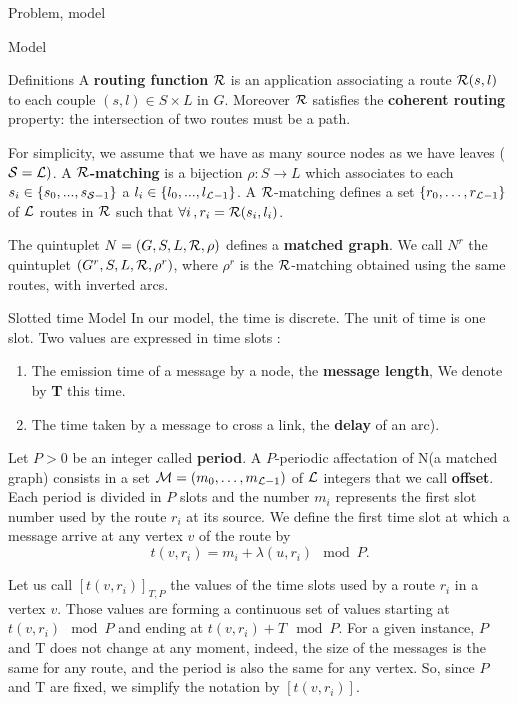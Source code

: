 \documentclass[a4paper,10pt]{report}
\newcommand\rmatching{${\cal R}$-matching\xspace}
\newcommand\matchedgraph{{\bf matched graph}}
\begin{document}
\begin{chapter}{Problem, model}
\begin{section}{Model}
\begin{subsection}{Definitions}
A {\bf routing function}  ${\cal R}$ is an application associating a route  ${\cal R}(s,l)$ to each couple $(s,l) \in S \times L$ in $G$.
Moreover ${\cal R}$ satisfies the {\bf coherent routing} property: the intersection of two routes must be a path.

For simplicity, we assume that we have as many source nodes as we have leaves (${\cal S} = {\cal L})$.
A {\bf ${\cal R}$-matching} is a bijection $\rho :S\rightarrow L$ which associates to each $s_i \in \{s_0,...,s_{{\cal S}-1}\}$ 
a $l_i \in \{l_0,...,l_{{\cal L}-1}\}$.
A \rmatching defines a set $\{r_0, \ldots ,r_{{\cal L}-1}\}$ of ${\cal L}$ routes in ${\cal R}$ such that $\forall i\,, r_i = {\cal R}(s_i,l_i)$.

The quintuplet $N=(G,S,L,{\cal R},\rho)$ defines a \matchedgraph. We call $N^r$ the quintuplet $(G^r,S,L,{\cal R},\rho^r)$, 
where $\rho^r$ is the \rmatching obtained using the same routes, with inverted arcs.

\end{subsection}
\begin{subsection}{Slotted time Model}
In our model, the time is discrete. The unit of time is one slot. Two values are expressed in time slots : 
\begin{enumerate}
 \item The emission time of a message by a node, the {\bf message length}, We denote by {\bf T} this time.
 \item The time taken by a message to cross a link, the {\bf delay} of an arc).
\end{enumerate}

Let $P>0$ be an integer called {\bf period}. 
A $P$-periodic affectation of N(a matched graph) consists in a set  ${\cal M}=(m_0, \ldots ,m_{{\cal L}-1})$
of ${\cal L}$ integers that we call {\bf offset}. 
Each period is divided in $P$ slots and the number $m_i$ represents the first slot number used by the route $r_i$ at its source.
We define the first time slot at which a message arrive at any vertex $v$ of the route by $$t(v,r_i) = m_i+\lambda(u,r_i) \mod P.$$

Let us call $[t(v,r_i)]_{T,P}$ the values of the time slots used by a route $r_i$ in a vertex $v$. 
Those values are forming a continuous set of values starting at $t(v,r_i) \mod P$ and ending at $t(v,r_i) + T \mod P$.
For a given instance, $P$ and T does not change at any moment, indeed, the size of the messages is the same for any route, and the period is also the same for any vertex.
So, since $P$ and T are fixed, we simplify the notation by $[t(v,r_i)]$.


\end{subsection}
\end{section}
\end{chapter}
\end{document}
